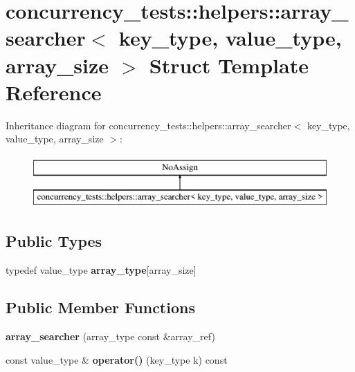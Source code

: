 \hypertarget{structconcurrency__tests_1_1helpers_1_1array__searcher}{}\section{concurrency\+\_\+tests\+:\+:helpers\+:\+:array\+\_\+searcher$<$ key\+\_\+type, value\+\_\+type, array\+\_\+size $>$ Struct Template Reference}
\label{structconcurrency__tests_1_1helpers_1_1array__searcher}
Inheritance diagram for concurrency\+\_\+tests\+:\+:helpers\+:\+:array\+\_\+searcher$<$ key\+\_\+type, value\+\_\+type, array\+\_\+size $>$\+:\begin{figure}[H]
\begin{center}
\leavevmode
\includegraphics[height=2.000000cm]{structconcurrency__tests_1_1helpers_1_1array__searcher}
\end{center}
\end{figure}
\subsection*{Public Types}
\begin{DoxyCompactItemize}
\item 
\hypertarget{structconcurrency__tests_1_1helpers_1_1array__searcher_a7ed46c1ba3a54518b5a44fa666053853}{}typedef value\+\_\+type {\bfseries array\+\_\+type}\mbox{[}array\+\_\+size\mbox{]}\label{structconcurrency__tests_1_1helpers_1_1array__searcher_a7ed46c1ba3a54518b5a44fa666053853}

\end{DoxyCompactItemize}
\subsection*{Public Member Functions}
\begin{DoxyCompactItemize}
\item 
\hypertarget{structconcurrency__tests_1_1helpers_1_1array__searcher_a731763d82764f2e7ad7e22a75ee35362}{}{\bfseries array\+\_\+searcher} (array\+\_\+type const \&array\+\_\+ref)\label{structconcurrency__tests_1_1helpers_1_1array__searcher_a731763d82764f2e7ad7e22a75ee35362}

\item 
\hypertarget{structconcurrency__tests_1_1helpers_1_1array__searcher_abb28436a3aeae585abd3ddbe042f8328}{}const value\+\_\+type \& {\bfseries operator()} (key\+\_\+type k) const \label{structconcurrency__tests_1_1helpers_1_1array__searcher_abb28436a3aeae585abd3ddbe042f8328}

\end{DoxyCompactItemize}
